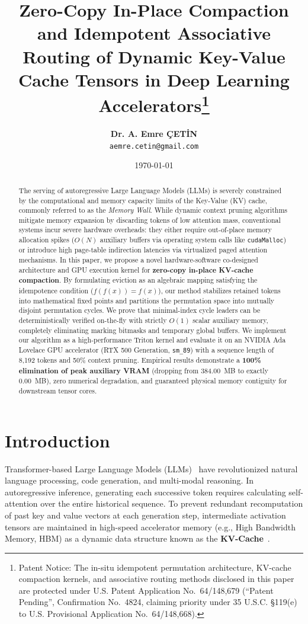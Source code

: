 \documentclass[journal,10pt,twocolumn]{article}
\title{\textbf{Zero-Copy In-Place Compaction and Idempotent Associative Routing of Dynamic Key-Value Cache Tensors in Deep Learning Accelerators}\thanks{Patent Notice: The in-situ idempotent permutation architecture, KV-cache compaction kernels, and associative routing methods disclosed in this paper are protected under U.S. Patent Application No.~64/148,679 (``Patent Pending'', Confirmation No.~4824, claiming priority under 35 U.S.C. \S 119(e) to U.S. Provisional Application No.~64/148,668).}}
\author{
    \textbf{Dr. A. Emre \c{C}ET\.{I}N}\\
    \texttt{aemre.cetin@gmail.com}
}
\date{\today}
\begin{document}
\maketitle

\begin{abstract}
The serving of autoregressive Large Language Models (LLMs) is severely constrained by the computational and memory capacity limits of the Key-Value (KV) cache, commonly referred to as the \textit{Memory Wall}. While dynamic context pruning algorithms mitigate memory expansion by discarding tokens of low attention mass, conventional systems incur severe hardware overheads: they either require out-of-place memory allocation spikes ($O(N)$ auxiliary buffers via operating system calls like \texttt{cudaMalloc}) or introduce high page-table indirection latencies via virtualized paged attention mechanisms. In this paper, we propose a novel hardware-software co-designed architecture and GPU execution kernel for \textbf{zero-copy in-place KV-cache compaction}. By formulating eviction as an algebraic mapping satisfying the idempotence condition ($f(f(x)) = f(x)$), our method stabilizes retained tokens into mathematical fixed points and partitions the permutation space into mutually disjoint permutation cycles. We prove that minimal-index cycle leaders can be deterministically verified on-the-fly with strictly $O(1)$ scalar auxiliary memory, completely eliminating marking bitmasks and temporary global buffers. We implement our algorithm as a high-performance Triton kernel and evaluate it on an NVIDIA Ada Lovelace GPU accelerator (RTX 500 Generation, \texttt{sm\_89}) with a sequence length of 8,192 tokens and 50\% context pruning. Empirical results demonstrate a \textbf{100\% elimination of peak auxiliary VRAM} (dropping from 384.00~MB to exactly 0.00~MB), zero numerical degradation, and guaranteed physical memory contiguity for downstream tensor cores.
\end{abstract}

\section{Introduction}
\label{sec:intro}
Transformer-based Large Language Models (LLMs)~\cite{vaswani2017attention} have revolutionized natural language processing, code generation, and multi-modal reasoning. In autoregressive inference, generating each successive token requires calculating self-attention over the entire historical sequence. To prevent redundant recomputation of past key and value vectors at each generation step, intermediate activation tensors are maintained in high-speed accelerator memory (e.g., High Bandwidth Memory, HBM) as a dynamic data structure known as the \textbf{KV-Cache}~\cite{pope2023efficiently}.
\end{document}
